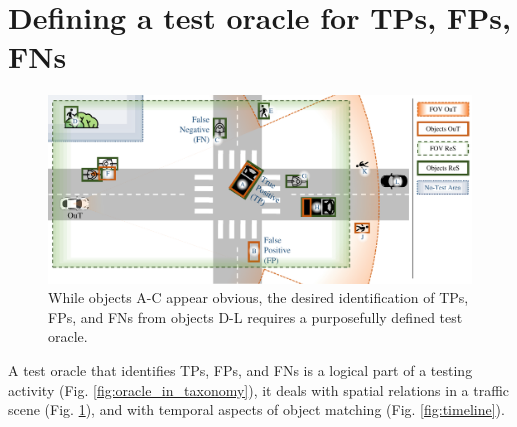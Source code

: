 \documentclass[conference]{IEEEtran}
\begin{document}




  






\section{Defining a test oracle for TPs, FPs, FNs}
\label{sec:criteria}



\begin{figure}[t]
	\centering
	\vspace*{2mm}
	\includegraphics[width=\textwidth]{img/top_down_fitting_slide.pdf}
	
	\caption{ While objects A-C appear obvious, the desired identification of TPs, FPs, and FNs from objects D-L requires a purposefully defined test oracle. 
	}
	\label{fig:top_down_all}
\end{figure}


A test oracle that identifies TPs, FPs, and FNs is a logical part of a testing activity (Fig. \ref{fig:oracle_in_taxonomy}), it deals with spatial relations in a traffic scene (Fig. \ref{fig:top_down_all}), and with temporal aspects of object matching (Fig. \ref{fig:timeline}).
\end{document}
